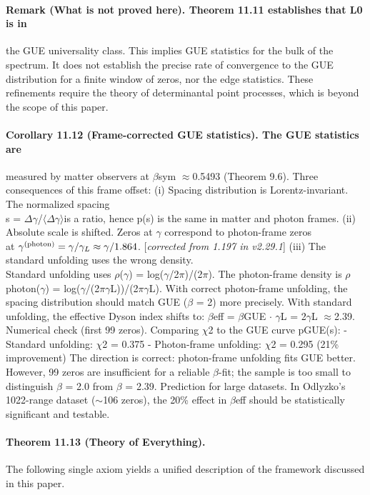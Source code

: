 \paragraph*{Remark (What is not proved here). Theorem 11.11 establishes that L0 is in}
the GUE universality class. This implies GUE statistics for the bulk of the spectrum. It does not establish the precise rate of convergence to the GUE distribution for a finite window of zeros, nor the edge statistics. These refinements require the theory of determinantal point processes, which is beyond the scope of this paper.
\paragraph*{Corollary 11.12 (Frame-corrected GUE statistics). The GUE statistics are}
measured by matter observers at $\beta$sym $\approx$0.5493 (Theorem 9.6). Three consequences of this frame offset:
(i) Spacing distribution is Lorentz-invariant. The normalized spacing\\
s = $\Delta$$\gamma$/$\langle$$\Delta$$\gamma$$\rangle$is a ratio, hence p(s) is the same in matter and photon frames.
(ii) Absolute scale is shifted. Zeros at $\gamma$ correspond to photon-frame zeros\\
at $\gamma^{(\mathrm{photon})} = \gamma/\gamma_L \approx \gamma/1.864$. [\emph{corrected from 1.197 in v2.29.1}]
(iii) The standard unfolding uses the wrong density.\\
Standard unfolding uses $\rho$($\gamma$) = log($\gamma$/2$\pi$)/(2$\pi$). The photon-frame density is $\rho$photon($\gamma$) = log($\gamma$/(2$\pi$$\gamma$L))/(2$\pi$$\gamma$L). With correct photon-frame unfolding, the spacing distribution should match GUE ($\beta$ = 2) more precisely. With standard unfolding, the effective Dyson index shifts to: $\beta$eff = $\beta$GUE $\cdot$ $\gamma$L = 2$\gamma$L $\approx$2.39. Numerical check (first 99 zeros). Comparing $\chi$2 to the GUE curve pGUE(s):
- Standard unfolding: $\chi$2 = 0.375
- Photon-frame unfolding: $\chi$2 = 0.295
(21\% improvement) The direction is correct: photon-frame unfolding fits GUE better. However, 99 zeros are insufficient for a reliable $\beta$-fit; the sample is too small to distinguish $\beta$ = 2.0 from $\beta$ = 2.39. Prediction for large datasets. In Odlyzko's 1022-range dataset ($\sim$106 zeros), the 20\% effect in $\beta$eff should be statistically significant and testable.
\paragraph*{Theorem 11.13 (Theory of Everything).}
The following single axiom yields a unified description of the framework discussed in this paper.

